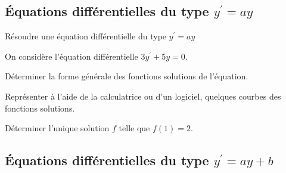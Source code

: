 \subsection{Équations différentielles du type $y^{\prime}=a y$}

\begin{bprop}
	\pointilles[\textwidth-0.5cm]
	
	\pointilles[\textwidth-0.5cm]
\end{bprop}

\begin{bdemo}
\end{bdemo}

\begin{bmethodet}{Résoudre une équation différentielle du type $y^{\prime}=a y$}
	
	On considère l'équation différentielle $3 y^{\prime}+5 y=0$.
	
	\begin{enumMet}
		\item \begin{enumMet}
			\item Déterminer la forme générale des fonctions solutions de l'équation.
			\item Représenter à l'aide de la calculatrice ou d'un logiciel, quelques courbes des fonctions solutions.
		\end{enumMet}
		\item Déterminer l'unique solution $f$ telle que $f(1)=2$.
	\end{enumMet}
	
\end{bmethodet}

\begin{bprop}
	\pointilles[\textwidth-0.5cm]
	
	\pointilles[\textwidth-0.5cm]
\end{bprop}

\begin{bdemo}
	\begin{itemDem}
		\item {}\pointilles[\textwidth-0.5cm]
		\item {}\pointilles[\textwidth-0.5cm]
	\end{itemDem}
\end{bdemo}

\subsection{Équations différentielles du type $y^{\prime}=a y+b$}

